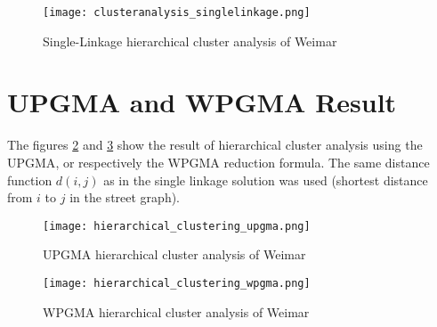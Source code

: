\begin{figure}
    \centering
    \begin{mdframed}[style=mdthight]
        \texttt{[image: clusteranalysis\_singlelinkage.png]}
    \end{mdframed}
    \caption{Single-Linkage hierarchical cluster analysis of Weimar\label{fig:SingleLinkage}}
\end{figure}

\section{UPGMA and WPGMA Result}
\label{sec:UPGMAandWPGMA}
The figures \ref{fig:hierarchical_clustering_upgma} and \ref{fig:hierarchical_clustering_wpgma} show the result of hierarchical cluster analysis using the \acrshort{UPGMA}, or respectively the \acrshort{WPGMA} reduction formula. The same distance function $d(i, j)$ as in the single linkage solution was used (shortest distance from $i$ to $j$ in the street graph).


\begin{figure}
    \centering
    \begin{mdframed}[style=mdthight]
        \texttt{[image: hierarchical\_clustering\_upgma.png]}
    \end{mdframed}
    \caption{UPGMA hierarchical cluster analysis of Weimar\label{fig:hierarchical_clustering_upgma}}
\end{figure}


\begin{figure}
    \centering
    \begin{mdframed}[style=mdthight]
        \texttt{[image: hierarchical\_clustering\_wpgma.png]}
    \end{mdframed}
    \caption{WPGMA hierarchical cluster analysis of Weimar\label{fig:hierarchical_clustering_wpgma}}
\end{figure}
